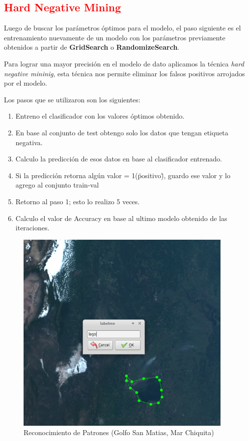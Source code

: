 \textcolor{red}{\subsection{Hard Negative Mining}\label{sub:hardnegativemining}}

Luego de buscar los parámetros óptimos para el modelo, el paso siguiente es el entrenamiento nuevamente de un modelo con los parámetros previamente obtenidos a partir de \textbf{GridSearch} o \textbf{RandomizeSearch}.

Para lograr una mayor precisión en el modelo de dato aplicamos la técnica \textit{hard negative mininig}, esta técnica nos permite eliminar los falsos positivos arrojados por el modelo.

Los pasos que se utilizaron son los siguientes:
\begin{enumerate}
	\item Entreno el clasificador con los valores óptimos obtenido.
	\item En base al conjunto de test obtengo solo los datos que tengan etiqueta negativa.
	\item Calculo la predicción de esos datos en base al clasificador entrenado.
	\item Si la predicción retorna algún valor = 1(\"positivo\"), guardo ese valor y lo agrego al conjunto train-val
	\item Retorno al paso 1; esto lo realizo 5 veces.
	\item Calculo el valor de Accuracy en base al ultimo modelo obtenido de las iteraciones.
\end{enumerate}

\begin{figure}[H]
 \centering
  \includegraphics[height=10cm,keepaspectratio=true,clip=true]{imagenes/Logos/labelme2.png}
  \caption{Reconocimiento de Patrones (Golfo San Matias, Mar Chiquita)}
	\label{Fig: reconocimientopatrones}
\end{figure}



